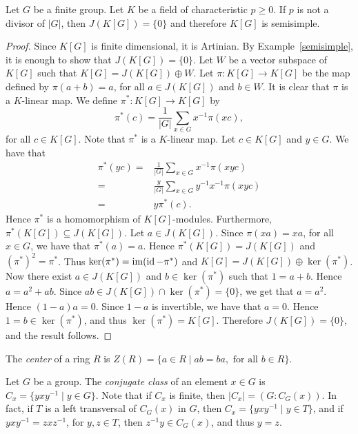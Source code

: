 \begin{theorem}
Let $G$ be a finite group. Let $K$ be a field of characteristic $p\geq 0$. If $p$ is not a divisor of $|G|$, then $J(K[G])=\{0\}$ and therefore $K[G]$ is semisimple.
\end{theorem}

\begin{proof}
    Since $K[G]$ is finite dimensional, it is Artinian. By Example~\ref{semisimple}, it is enough to show that $J(K[G])=\{ 0\}$. Let $W$ be a vector subspace of $K[G]$ such that
    $K[G]=J(K[G])\oplus W$. Let $\pi\colon K[G]\rightarrow K[G]$ be the map defined by $\pi(a+b)=a$, for all $a\in J(K[G])$ and $b\in W$.
    It is clear that $\pi$ is a $K$-linear map. We define $\pi^*\colon K[G]\rightarrow K[G]$ by
    \[\pi^*(c)=\frac{1}{|G|}\sum_{x\in G}x^{-1}\pi(xc),\]
    for all $c\in K[G]$. Note that $\pi^*$ is a $K$-linear map. Let $c\in K[G]$ and $y\in G$. We have that
    \begin{align*}
        \pi^*(yc)=&\frac{1}{|G|}\sum_{x\in G}x^{-1}\pi(xyc)\\
        =&\frac{y}{|G|}\sum_{x\in G}y^{-1}x^{-1}\pi(xyc)\\
        =& y\pi^*(c).
    \end{align*}
    Hence $\pi^*$ is a homomorphism of $K[G]$-modules. Furthermore, $\pi^*(K[G])\subseteq J(K[G])$. Let $a\in J(K[G])$. Since
    $\pi(xa)=xa$, for all $x\in G$, we have that $\pi^*(a)=a$. Hence $\pi^*(K[G])=J(K[G])$ and $(\pi^*)^2=\pi^*$. Thus $\ker(\pi^*)=\operatorname{im}(\operatorname{id}-\pi^*)$ and $K[G]=J(K[G])\oplus \ker(\pi^*)$. Now there exist $a\in J(K[G])$ and $b\in \ker(\pi^*)$ such that
    $1=a+b$. Hence $a=a^2+ab$. Since $ab\in J(K[G])\cap\ker(\pi^*)=\{ 0\}$, we get that $a=a^2$. Hence $(1-a)a=0$. Since $1-a$ is invertible, we have that $a=0$. Hence $1=b\in \ker(\pi^*)$, and thus $\ker(\pi^*)=K[G]$. Therefore $J(K[G])=\{ 0\}$, and the result follows. 
\end{proof}

The {\em center} of a ring $R$ is $Z(R)=\{ a\in R\mid ab=ba, \mbox{ for all }b\in R\}$.

Let $G$ be a group. The {\em conjugate class} of an element $x\in G$ is $C_x=\{ yxy^{-1}\mid y\in G\}$. Note that if $C_x$ is finite, then $|C_x|=(G:C_G(x))$. In fact, if $T$ is a left transversal of $C_G(x)$ in $G$, then $C_x=\{ yxy^{-1}\mid y\in T\}$, and if $yxy^{-1}=zxz^{-1}$, for $y,z\in T$, then $z^{-1}y\in C_G(x)$, and thus $y=z$. 

